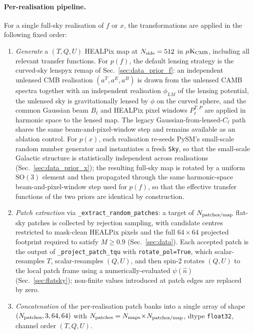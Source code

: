 \documentclass[11pt]{article}
\theoremstyle{definition}
\begin{document}
\paragraph{Per-realisation pipeline.} For a single full-sky realisation of $f$ or $x$, the transformations are applied in the following fixed order:
\begin{enumerate}[leftmargin=2.0em,itemsep=0.1em]
  \item \emph{Generate} a $(T,Q,U)$ HEALPix map at $N_{\rm side}=512$ in $\mu\mathrm{K}_{\rm CMB}$, including all relevant transfer functions. For $p(f)$, the default lensing strategy is the curved-sky lenspyx remap of Sec.~\ref{sec:data_prior_f}: an independent unlensed CMB realisation $(a^T,a^E,a^B)$ is drawn from the unlensed CAMB spectra together with an independent realisation $\phi_{LM}$ of the lensing potential, the unlensed sky is gravitationally lensed by $\phi$ on the curved sphere, and the common Gaussian beam $B_\ell$ and HEALPix pixel windows $P_\ell^{T,P}$ are applied in harmonic space to the lensed map. The legacy Gaussian-from-lensed-$C_\ell$ path shares the same beam-and-pixel-window step and remains available as an ablation control. For $p(x)$, each realisation re-seeds PySM's small-scale random number generator and instantiates a fresh \texttt{Sky}, so that the small-scale Galactic structure is statistically independent across realisations (Sec.~\ref{sec:data_prior_x}); the resulting full-sky map is rotated by a uniform $\mathrm{SO}(3)$ element and then propagated through the same harmonic-space beam-and-pixel-window step used for $p(f)$, so that the effective transfer functions of the two priors are identical by construction.
  \item \emph{Patch extraction} via \texttt{\_extract\_random\_patches}: a target of $N_{\rm patches/map}$ flat-sky patches is collected by rejection sampling, with candidate centres restricted to mask-clean HEALPix pixels and the full $64\!\times\!64$ projected footprint required to satisfy $M\!\geq\!0.9$ (Sec.~\ref{sec:data}). Each accepted patch is the output of \texttt{\_project\_patch\_tqu} with \texttt{rotate\_pol=True}, which scalar-resamples $T$, scalar-resamples $(Q,U)$, and then spin-2 rotates $(Q,U)$ to the local patch frame using a numerically-evaluated $\psi(\hat n)$ (Sec.~\ref{sec:flatsky}); non-finite values introduced at patch edges are replaced by zero.
  \item \emph{Concatenation} of the per-realisation patch banks into a single array of shape $(N_{\rm patches},3,64,64)$ with $N_{\rm patches}=N_{\rm maps}\!\times\!N_{\rm patches/map}$, dtype \texttt{float32}, channel order $(T,Q,U)$.
\end{enumerate}
\end{document}
